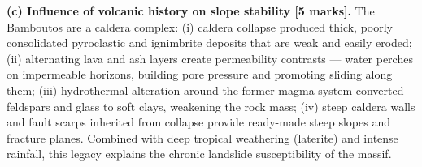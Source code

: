 \documentclass[11pt]{article}
\begin{document}
\begin{corrige}
\textbf{(c) Influence of volcanic history on slope stability [5 marks].} The Bamboutos are a caldera complex: (i) caldera collapse produced thick, poorly consolidated pyroclastic and ignimbrite deposits that are weak and easily eroded; (ii) alternating lava and ash layers create permeability contrasts — water perches on impermeable horizons, building pore pressure and promoting sliding along them; (iii) hydrothermal alteration around the former magma system converted feldspars and glass to soft clays, weakening the rock mass; (iv) steep caldera walls and fault scarps inherited from collapse provide ready-made steep slopes and fracture planes. Combined with deep tropical weathering (laterite) and intense rainfall, this legacy explains the chronic landslide susceptibility of the massif.
\end{corrige}
\end{document}
